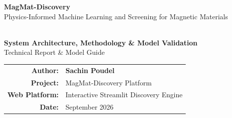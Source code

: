 \documentclass[11pt,a4paper]{article}
\begin{document}
\hypersetup{pageanchor=false}
\begin{titlepage}
    \centering
    \vspace*{1.5cm}
    
    {\Huge\sffamily\bfseries\color{navyblue} MagMat-Discovery}\\[0.4cm]
    {\LARGE\sffamily\color{darkslate} Physics-Informed Machine Learning and Screening for Magnetic Materials}\\[0.8cm]
    
    \\[1.2cm]
    
    {\Large\sffamily\bfseries System Architecture, Methodology \& Model Validation}\\[0.5cm]
    {\large\sffamily Technical Report \& Model Guide}\\[3.0cm]
    
    \begin{minipage}{0.75\textwidth}
        \centering
        \sffamily
        \begin{tabular}{r l}
            \textbf{\color{navyblue} Author:} & \Large\textbf{Sachin Poudel} \\[0.3cm]
            \textbf{\color{navyblue} Project:} & MagMat-Discovery Platform \\[3pt]
            \textbf{\color{navyblue} Web Platform:} & Interactive Streamlit Discovery Engine \\[3pt]
            \textbf{\color{navyblue} Date:} & September 2026 \\
        \end{tabular}
    \end{minipage}
    
    \vfill
\end{titlepage}
\hypersetup{pageanchor=true}

\newpage
{}
\tableofcontents
\newpage
{}
\end{document}
